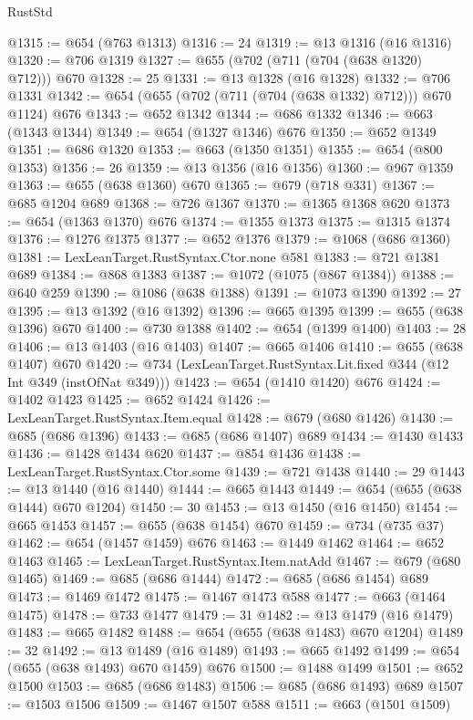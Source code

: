 \begin{lexlean}{RustStd}
\begin{coremodule}
@1315 := @654 (@763 @1313)
@1316 := 24
@1319 := @13 @1316 (@16 @1316)
@1320 := @706 @1319
@1327 := @655 (@702 (@711 (@704 (@638 @1320) @712))) @670
@1328 := 25
@1331 := @13 @1328 (@16 @1328)
@1332 := @706 @1331
@1342 := @654 (@655 (@702 (@711 (@704 (@638 @1332) @712))) @670 @1124) @676
@1343 := @652 @1342
@1344 := @686 @1332
@1346 := @663 (@1343 @1344)
@1349 := @654 (@1327 @1346) @676
@1350 := @652 @1349
@1351 := @686 @1320
@1353 := @663 (@1350 @1351)
@1355 := @654 (@800 @1353)
@1356 := 26
@1359 := @13 @1356 (@16 @1356)
@1360 := @967 @1359
@1363 := @655 (@638 @1360) @670
@1365 := @679 (@718 @331)
@1367 := @685 @1204 @689
@1368 := @726 @1367
@1370 := @1365 @1368 @620
@1373 := @654 (@1363 @1370) @676
@1374 := @1355 @1373
@1375 := @1315 @1374
@1376 := @1276 @1375
@1377 := @652 @1376
@1379 := @1068 (@686 @1360)
@1381 := LexLeanTarget.RustSyntax.Ctor.none @581
@1383 := @721 @1381 @689
@1384 := @868 @1383
@1387 := @1072 (@1075 (@867 @1384))
@1388 := @640 @259
@1390 := @1086 (@638 @1388)
@1391 := @1073 @1390
@1392 := 27
@1395 := @13 @1392 (@16 @1392)
@1396 := @665 @1395
@1399 := @655 (@638 @1396) @670
@1400 := @730 @1388
@1402 := @654 (@1399 @1400)
@1403 := 28
@1406 := @13 @1403 (@16 @1403)
@1407 := @665 @1406
@1410 := @655 (@638 @1407) @670
@1420 := @734 (LexLeanTarget.RustSyntax.Lit.fixed @344 (@12 Int @349 (instOfNat @349)))
@1423 := @654 (@1410 @1420) @676
@1424 := @1402 @1423
@1425 := @652 @1424
@1426 := LexLeanTarget.RustSyntax.Item.equal
@1428 := @679 (@680 @1426)
@1430 := @685 (@686 @1396)
@1433 := @685 (@686 @1407) @689
@1434 := @1430 @1433
@1436 := @1428 @1434 @620
@1437 := @854 @1436
@1438 := LexLeanTarget.RustSyntax.Ctor.some
@1439 := @721 @1438
@1440 := 29
@1443 := @13 @1440 (@16 @1440)
@1444 := @665 @1443
@1449 := @654 (@655 (@638 @1444) @670 @1204)
@1450 := 30
@1453 := @13 @1450 (@16 @1450)
@1454 := @665 @1453
@1457 := @655 (@638 @1454) @670
@1459 := @734 (@735 @37)
@1462 := @654 (@1457 @1459) @676
@1463 := @1449 @1462
@1464 := @652 @1463
@1465 := LexLeanTarget.RustSyntax.Item.natAdd
@1467 := @679 (@680 @1465)
@1469 := @685 (@686 @1444)
@1472 := @685 (@686 @1454) @689
@1473 := @1469 @1472
@1475 := @1467 @1473 @588
@1477 := @663 (@1464 @1475)
@1478 := @733 @1477
@1479 := 31
@1482 := @13 @1479 (@16 @1479)
@1483 := @665 @1482
@1488 := @654 (@655 (@638 @1483) @670 @1204)
@1489 := 32
@1492 := @13 @1489 (@16 @1489)
@1493 := @665 @1492
@1499 := @654 (@655 (@638 @1493) @670 @1459) @676
@1500 := @1488 @1499
@1501 := @652 @1500
@1503 := @685 (@686 @1483)
@1506 := @685 (@686 @1493) @689
@1507 := @1503 @1506
@1509 := @1467 @1507 @588
@1511 := @663 (@1501 @1509)

\end{coremodule}
\end{lexlean}
